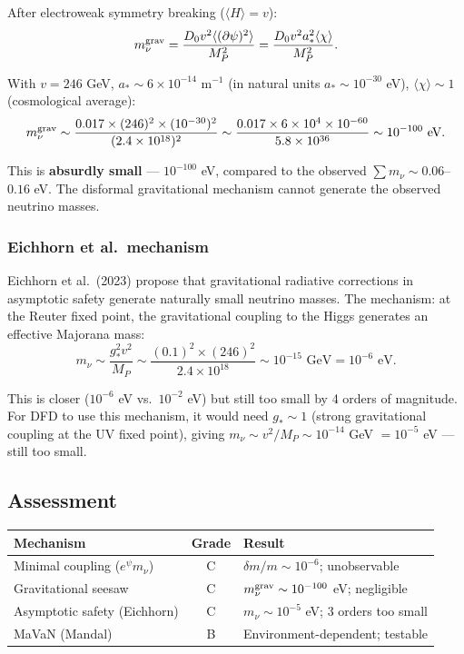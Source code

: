 \documentclass[11pt,a4paper]{article}
\begin{document}
After electroweak symmetry breaking ($\langle H\rangle = v$):
\begin{equation}
m_\nu^{\rm grav} = \frac{D_0 v^2 \langle(\partial\psi)^2\rangle}{M_P^2} = \frac{D_0 v^2 a_*^2 \langle\chi\rangle}{M_P^2}.
\end{equation}

With $v = 246$ GeV, $a_* \sim 6\times10^{-14}$ m$^{-1}$ (in natural units $a_* \sim 10^{-30}$ eV), $\langle\chi\rangle \sim 1$ (cosmological average):
\begin{equation}
m_\nu^{\rm grav} \sim \frac{0.017 \times (246)^2 \times (10^{-30})^2}{(2.4\times10^{18})^2} \sim \frac{0.017 \times 6\times10^4 \times 10^{-60}}{5.8\times10^{36}} \sim 10^{-100}\text{ eV}.
\end{equation}

This is \textbf{absurdly small} --- $10^{-100}$ eV, compared to the observed $\sum m_\nu \sim 0.06$--$0.16$ eV. The disformal gravitational mechanism cannot generate the observed neutrino masses.

\subsubsection{Eichhorn et al.\ mechanism}

Eichhorn et al.\ (2023) propose that gravitational radiative corrections in asymptotic safety generate naturally small neutrino masses. The mechanism: at the Reuter fixed point, the gravitational coupling to the Higgs generates an effective Majorana mass:
\begin{equation}
m_\nu \sim \frac{g_*^2 v^2}{M_P} \sim \frac{(0.1)^2 \times (246)^2}{2.4\times10^{18}} \sim 10^{-15}\text{ GeV} = 10^{-6}\text{ eV}.
\end{equation}

This is closer ($10^{-6}$ eV vs.\ $10^{-2}$ eV) but still too small by 4 orders of magnitude. For DFD to use this mechanism, it would need $g_* \sim 1$ (strong gravitational coupling at the UV fixed point), giving $m_\nu \sim v^2/M_P \sim 10^{-14}$ GeV $= 10^{-5}$ eV --- still too small.

\subsection{Assessment}

\begin{center}
\begin{tabular}{lcl}
\toprule
\textbf{Mechanism} & \textbf{Grade} & \textbf{Result} \\
\midrule
Minimal coupling ($e^\psi m_\nu$) & C & $\delta m/m \sim 10^{-6}$; unobservable \\
Gravitational seesaw & C & $m_\nu^{\rm grav} \sim 10^{-100}$ eV; negligible \\
Asymptotic safety (Eichhorn) & C & $m_\nu \sim 10^{-5}$ eV; 3 orders too small \\
MaVaN (Mandal) & B & Environment-dependent; testable \\
\bottomrule
\end{tabular}
\end{center}
\end{document}

